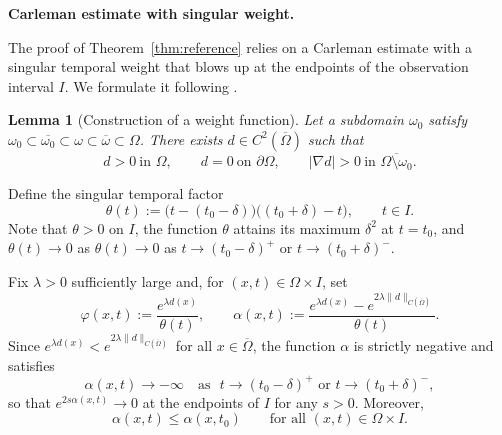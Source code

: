 \documentclass[12pt]{amsart}
\theoremstyle{plain}
\newtheorem{lemma}{Lemma}[section]
\theoremstyle{definition}
\theoremstyle{remark}
\newcommand{\ooo}{\overline}
\newcommand{\Om}{\Omega}
\begin{document}
\medskip\noindent\textbf{Carleman estimate with singular weight.}

The proof of Theorem~\ref{thm:reference} relies on a Carleman estimate with a singular temporal weight that blows up at the endpoints of the observation interval $I$. We formulate it following
\cite{fursikov1996controllability, Ima1}.

\begin{lemma}[Construction of a weight function]\label{lem:d}
Let a subdomain $\omega_0$ satisfy $\omega_0 \subset \ooo{\omega_0} 
\subset \omega \subset \ooo{\omega} \subset\Omega$.
There exists $d\in C^2(\overline\Omega)$ such that
\[
d>0\ \text{in }\Omega,\qquad d=0\ \text{on }\partial\Omega,\qquad
|\nabla d|>0\ \text{in }\overline{\Omega\setminus\omega_0}.
\]
\end{lemma}

Define the singular temporal factor
\[
\theta(t):=\bigl(t-(t_0-\delta)\bigr)\bigl((t_0+\delta)-t\bigr),
\qquad t\in I.
\]
Note that $\theta>0$ on $I$, the function $\theta$ attains its maximum 
$\delta^2$ at
$t=t_0$, and $\theta(t)\to 0$ as $\theta(t)\to 0$ as $t\to (t_0-\delta)^+$ or $t\to (t_0+\delta)^-$. 

Fix $\lambda>0$ sufficiently large and, for
$(x,t)\in\Omega\times I$, set
\begin{equation}\label{eq:weights-sing}
\varphi(x,t):=\frac{e^{\lambda d(x)}}{\theta(t)},\qquad
\alpha(x,t):=\frac{e^{\lambda d(x)}-e^{2\lambda\|d\|_{C(\overline\Omega)}}}
{\theta(t)}.
\end{equation}
Since $e^{\lambda d(x)}<e^{2\lambda\|d\|_{C(\overline\Om)}}$ for all
$x\in\overline\Om$, the function $\alpha$ is strictly negative and satisfies
\begin{equation}\label{eq:alpha-blowup}
\alpha(x,t)\to -\infty\quad\text{as }\,\,
t\to (t_0-\delta)^+ \text{ or  } t\to (t_0+\delta)^-,
\end{equation}
so that $e^{2s\alpha(x,t)}\to0$ at the endpoints of $I$ for any $s>0$.
Moreover,
\begin{equation}\label{eq:alpha-max}
\alpha(x,t)\le \alpha(x,t_0)\qquad\text{for all }
(x,t)\in\Omega\times I.
\end{equation}
\end{document}
